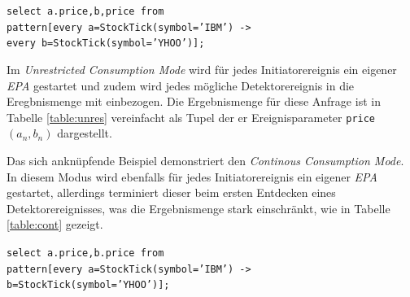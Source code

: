 \documentclass{acm_proc_article-sp}
\begin{document}
\texttt{select a.price,b,price from\\pattern[every a=StockTick(symbol='IBM') ->\\
every b=StockTick(symbol='YHOO')];}

Im \textit{Unrestricted Consumption Mode} wird für jedes Initiatorereignis ein eigener 
\textit{EPA} gestartet und zudem wird jedes mögliche Detektorereignis in die 
Eregbnismenge mit einbezogen. Die Ergebnismenge für diese Anfrage ist in Tabelle 
\ref{table:unres} vereinfacht als Tupel der er Ereignisparameter \texttt{price} 
$(a_n,b_n)$ dargestellt. 


\begin{table}[ht]
    \caption{\textit{Unrestricted Consumption Mode}}
    \label{table:unres}\vspace{0.2cm}
\end{table}


Das sich anknüpfende Beispiel demonstriert den \textit{Continous Consumption Mode}. In 
diesem Modus wird ebenfalls für jedes Initiatorereignis ein eigener \textit{EPA} 
gestartet, allerdings terminiert dieser beim ersten Entdecken eines Detektorereignisses, 
was die Ergebnismenge stark einschränkt, wie in Tabelle \ref{table:cont} gezeigt.
 
\texttt{select a.price,b.price from\\pattern[every a=StockTick(symbol='IBM') ->\\
b=StockTick(symbol='YHOO')];}
\end{document}
